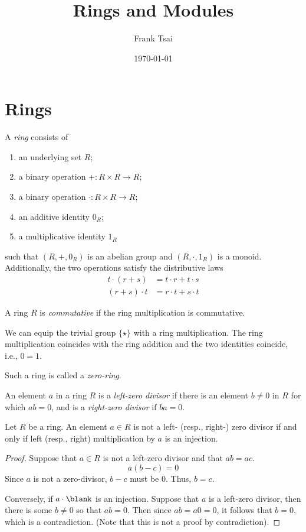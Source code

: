 \documentclass{amsart}
\title{Rings and Modules}
\author{Frank Tsai}
\date{\today}
\begin{document}
\maketitle
\tableofcontents

\section{Rings}
\label{sec:rings}

\begin{defn}
  A \emph{ring} consists of
  \begin{enumerate}
  \item an underlying set $R$;
  \item a binary operation $+ : R \times R \to R$;
  \item a binary operation $\cdot : R \times R \to R$;
  \item an additive identity $0_{R}$;
  \item a multiplicative identity $1_{R}$
  \end{enumerate}
  such that $(R,+,0_{R})$ is an abelian group and $(R,\cdot,1_{R})$ is a monoid.
  Additionally, the two operations satisfy the distributive laws
  \begin{align}
    t \cdot (r + s) &= t \cdot r + t \cdot s\\
    (r + s) \cdot t &= r \cdot t + s \cdot t
  \end{align}
\end{defn}

\begin{defn}
  A ring $R$ is \emph{commutative} if the ring multiplication is commutative.
\end{defn}

We can equip the trivial group $\{\star\}$ with a ring multiplication.
The ring multiplication coincides with the ring addition and the two identities coincide, i.e., $0 = 1$.
\begin{defn}
  Such a ring is called a \emph{zero-ring}.
\end{defn}

\begin{defn}
  An element $a$ in a ring $R$ is a \emph{left-zero divisor} if there is an element $b \ne 0$ in $R$ for which $ab = 0$, and is a \emph{right-zero divisor} if $ba = 0$.
\end{defn}

\begin{lem}\label{lem:zero-divisor-characterization}
  Let $R$ be a ring.
  An element $a \in R$ is not a left- (resp., right-) zero divisor if and only if left (resp., right) multiplication by $a$ is an injection.
\end{lem}
\begin{proof}
  Suppose that $a \in R$ is not a left-zero divisor and that $ab = ac$.
  \[
    a(b - c) = 0
  \]
  Since $a$ is not a zero-divisor, $b - c$ must be $0$.
  Thus, $b = c$.

  Conversely, if $a \cdot \blank$ is an injection.
  Suppose that $a$ is a left-zero divisor, then there is some $b \ne 0$ so that $ab = 0$.
  Then since $ab = a0 = 0$, it follows that $b = 0$, which is a contradiction.
  (Note that this is not a proof by contradiction).
\end{proof}
\end{document}
